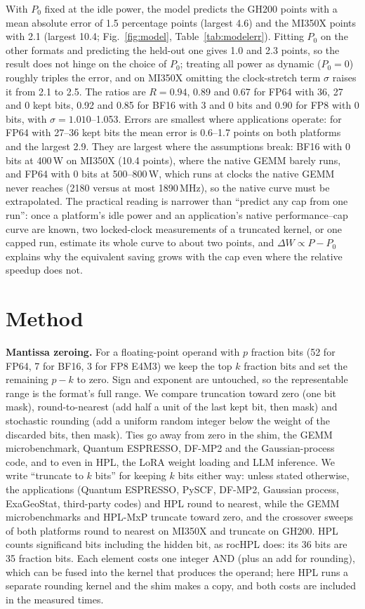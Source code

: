 \documentclass[conference]{IEEEtran}
\newcommand{\W}{\,W}
\begin{document}
With $P_0$ fixed at the idle power, the model predicts the GH200 points with a mean absolute error of 1.5 percentage
points (largest 4.6) and the MI350X points with 2.1 (largest 10.4; Fig.~\ref{fig:model}, Table~\ref{tab:modelerr}).
Fitting $P_0$ on the other formats and predicting the held-out one gives 1.0 and 2.3 points, so the result does not hinge
on the choice of $P_0$; treating all power as dynamic ($P_0=0$) roughly triples the error, and on MI350X omitting the
clock-stretch term $\sigma$ raises it from 2.1 to 2.5. The ratios are $R=0.94$, 0.89 and 0.67 for FP64 with 36, 27 and 0 kept
bits, 0.92 and 0.85 for BF16 with 3 and 0 bits and 0.90 for FP8 with 0 bits, with $\sigma=1.010$--1.053. Errors are smallest
where applications operate: for FP64 with 27--36 kept bits the mean error is 0.6--1.7 points on both platforms and the
largest 2.9. They are largest where the assumptions break: BF16 with 0 bits at 400\W{} on MI350X (10.4 points), where the
native GEMM barely runs, and FP64 with 0 bits at 500--800\W, which runs at clocks the native GEMM never reaches (2180
versus at most 1890\,MHz), so the native curve must be extrapolated. The practical reading is narrower than ``predict any
cap from one run'': once a platform's idle power and an application's native performance--cap curve are known, two
locked-clock measurements of a truncated kernel, or one capped run, estimate its whole curve to about two points, and
$\Delta W\propto P-P_0$ explains why the equivalent saving grows with the cap even where the relative speedup does not.

\section{Method}\label{sec:method}

\textbf{Mantissa zeroing.} For a floating-point operand with $p$ fraction bits (52 for FP64, 7 for BF16, 3 for FP8
E4M3) we keep the top $k$ fraction bits and set the remaining $p-k$ to zero. Sign and exponent are untouched, so
the representable range is the format's full range. We compare truncation toward zero (one bit mask),
round-to-nearest (add half a unit of the last kept bit, then mask) and stochastic rounding (add a uniform random
integer below the weight of the discarded bits, then mask). Ties go away from zero in the shim, the GEMM
microbenchmark, Quantum ESPRESSO, DF-MP2 and the Gaussian-process code, and to even in HPL, the LoRA weight loading
and LLM inference. We write ``truncate to $k$ bits'' for keeping $k$ bits either way: unless stated otherwise, the
applications (Quantum ESPRESSO, PySCF, DF-MP2, Gaussian process, ExaGeoStat, third-party codes) and HPL round to
nearest, while the GEMM microbenchmarks and HPL-MxP truncate toward zero, and the crossover sweeps of both platforms
round to nearest on MI350X and truncate on GH200. HPL counts significand bits including the hidden bit, as rocHPL does:
its 36 bits are 35 fraction bits. Each element costs one integer AND (plus an add for rounding), which can be fused into
the kernel that produces the operand; here HPL runs a separate rounding kernel and the shim makes a copy, and both costs
are included in the measured times.
\end{document}

